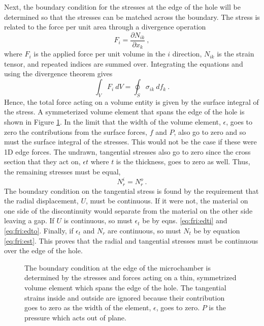 Next, the boundary condition for the stresses at the edge of the hole will be determined so that the stresses can be matched across the boundary.
The stress is related to the force per unit area through a divergence operation
\begin{equation}
	F_i=\frac{\partial N_{ik}}{\partial x_k} \ ,
\end{equation}
where $F_i$ is the applied force per unit volume in the $i$ direction, $N_{ik}$ is the strain tensor, and repeated indices are summed over.
Integrating the equations and using the divergence theorem gives
\begin{equation}
	\int_V F_i \ dV=\oint_S \sigma_{ik} \ df_k \ .
\end{equation}
Hence, the total force acting on a volume entity is given by the surface integral of the stress.
A symmeterized volume element that spans the edge of the hole is shown in Figure \ref{fig:fri:egestress}.
In the limit that the width of the volume element, $\epsilon$, goes to zero the contributions from the surface forces, $f$ and $P$, also go to zero and so must the surface integral of the stresses.
This would not be the case if these were 1D edge forces.
The undrawn, tangential stresses also go to zero since the cross section that they act on, $\epsilon t$ where $t$ is the thickness, goes to zero as well. 
Thus, the remaining stresses must be equal,
\begin{equation}
	N_r^i=N_r^o \ .
\end{equation}
The boundary condition on the tangential stress is found by the requirement that the radial displacement, $U$, must be continuous.
If it were not, the material on one side of the discontinuity would separate from the material on the other side leaving a gap.
If $U$ is continuous, so must $\epsilon_t$ be by eqns. \ref{eq:fri:edti} and \ref{eq:fri:edto}.
Finally, if $\epsilon_t$ and $N_r$ are continuous, so must $N_t$ be by equation \ref{eq:fri:est}.
This proves that the radial and tangential stresses must be continuous over the edge of the hole.

\begin{figure}
	\begin{center}
	
	\end{center}
	\caption[Boundary conditions at the microchamber edge]{\label{fig:fri:egestress}
	The boundary condition at the edge of the microchamber is determined by the stresses and forces acting on a thin, symmetrized volume element which spans the edge of the hole.
	The tangential strains inside and outside are ignored because their contribution goes to zero as the width of the element, $\epsilon$, goes to zero.
	$P$ is the pressure which acts out of plane.}
\end{figure}

